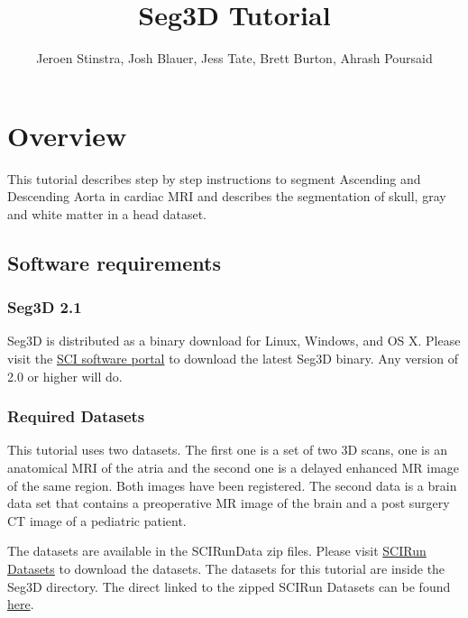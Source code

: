 \documentclass[fleqn,11pt,openany]{book}
\title{Seg3D Tutorial}
\author{Jeroen Stinstra, Josh Blauer, Jess Tate, Brett Burton, Ahrash Poursaid}
\begin{document}




\chapter{Overview}

\begin{introduction}

This tutorial describes step by step instructions to segment Ascending and Descending Aorta in cardiac MRI and describes the segmentation of skull, gray and white matter in a head dataset. 

\end{introduction}

\section{Software requirements}

\subsection{Seg3D 2.1}

Seg3D is distributed as a binary download for Linux, Windows, and OS X. Please visit the \href{http://software.sci.utah.edu}{SCI software portal} to download the latest Seg3D binary. Any version of 2.0 or higher will do. 

\subsection{Required Datasets}

This tutorial uses two datasets. The first one is a set  of two 3D scans, one is an anatomical MRI of the atria and the second one is a delayed enhanced MR image of the same region. Both images have been registered. The second data is a brain data set that contains a preoperative MR image of the brain and a post surgery CT image of a pediatric patient.

The datasets are available in the SCIRunData zip files. Please visit \href{http://www.sci.utah.edu/cibc/software/106-scirun.html}{SCIRun Datasets} to download the datasets. The datasets for this tutorial are inside the Seg3D directory. The direct linked to the zipped SCIRun Datasets can be found \href{http://www.sci.utah.edu/download/scirun/4.4.html}{here}.
\end{document}
